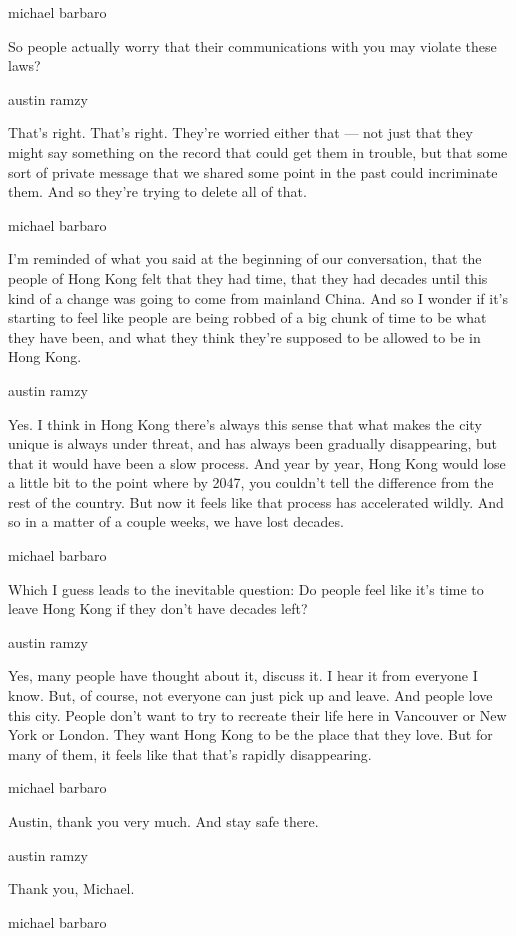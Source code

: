 michael barbaro

So people actually worry that their communications with you may violate
these laws?

austin ramzy

That's right. That's right. They're worried either that --- not just
that they might say something on the record that could get them in
trouble, but that some sort of private message that we shared some point
in the past could incriminate them. And so they're trying to delete all
of that.

michael barbaro

I'm reminded of what you said at the beginning of our conversation, that
the people of Hong Kong felt that they had time, that they had decades
until this kind of a change was going to come from mainland China. And
so I wonder if it's starting to feel like people are being robbed of a
big chunk of time to be what they have been, and what they think they're
supposed to be allowed to be in Hong Kong.

austin ramzy

Yes. I think in Hong Kong there's always this sense that what makes the
city unique is always under threat, and has always been gradually
disappearing, but that it would have been a slow process. And year by
year, Hong Kong would lose a little bit to the point where by 2047, you
couldn't tell the difference from the rest of the country. But now it
feels like that process has accelerated wildly. And so in a matter of a
couple weeks, we have lost decades.

michael barbaro

Which I guess leads to the inevitable question: Do people feel like it's
time to leave Hong Kong if they don't have decades left?

austin ramzy

Yes, many people have thought about it, discuss it. I hear it from
everyone I know. But, of course, not everyone can just pick up and
leave. And people love this city. People don't want to try to recreate
their life here in Vancouver or New York or London. They want Hong Kong
to be the place that they love. But for many of them, it feels like that
that's rapidly disappearing.

michael barbaro

Austin, thank you very much. And stay safe there.

austin ramzy

Thank you, Michael.

michael barbaro

